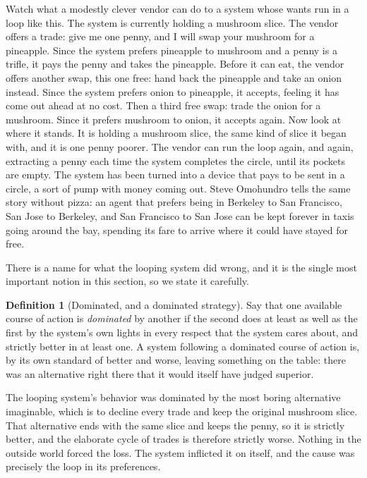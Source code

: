 \documentclass[10pt]{article}
\theoremstyle{definition}
\newtheorem{definition}[theorem]{Definition}
\theoremstyle{remark}
\begin{document}
Watch what a modestly clever vendor can do to a system whose wants run in a loop like this. The system is currently holding a mushroom slice. The vendor offers a trade: give me one penny, and I will swap your mushroom for a pineapple. Since the system prefers pineapple to mushroom and a penny is a trifle, it pays the penny and takes the pineapple. Before it can eat, the vendor offers another swap, this one free: hand back the pineapple and take an onion instead. Since the system prefers onion to pineapple, it accepts, feeling it has come out ahead at no cost. Then a third free swap: trade the onion for a mushroom. Since it prefers mushroom to onion, it accepts again. Now look at where it stands. It is holding a mushroom slice, the same kind of slice it began with, and it is one penny poorer. The vendor can run the loop again, and again, extracting a penny each time the system completes the circle, until its pockets are empty. The system has been turned into a device that pays to be sent in a circle, a sort of pump with money coming out. Steve Omohundro tells the same story without pizza: an agent that prefers being in Berkeley to San Francisco, San Jose to Berkeley, and San Francisco to San Jose can be kept forever in taxis going around the bay, spending its fare to arrive where it could have stayed for free.

There is a name for what the looping system did wrong, and it is the single most important notion in this section, so we state it carefully.

\begin{definition}[Dominated, and a dominated strategy]
\label{def:dominated}
Say that one available course of action is \emph{dominated} by another if the second does at least as well as the first by the system's own lights in every respect that the system cares about, and strictly better in at least one. A system following a dominated course of action is, by its own standard of better and worse, leaving something on the table: there was an alternative right there that it would itself have judged superior.
\end{definition}

The looping system's behavior was dominated by the most boring alternative imaginable, which is to decline every trade and keep the original mushroom slice. That alternative ends with the same slice and keeps the penny, so it is strictly better, and the elaborate cycle of trades is therefore strictly worse. Nothing in the outside world forced the loss. The system inflicted it on itself, and the cause was precisely the loop in its preferences.
\end{document}
